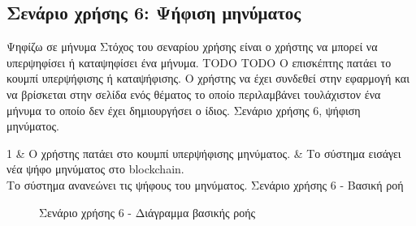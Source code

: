\subsection{Σενάριο χρήσης 6: Ψήφιση μηνύματος} \label{subsection:3-4-use-case-vote-post}

\useCaseTable
{Ψηφίζω σε μήνυμα}
{Στόχος του σεναρίου χρήσης είναι ο χρήστης να μπορεί να υπερψηφίσει ή καταψηφίσει ένα μήνυμα.}
{TODO}
{TODO}
{Ο επισκέπτης πατάει το κουμπί υπερψήφισης ή καταψήφισης.}
{Ο χρήστης να έχει συνδεθεί στην εφαρμογή και να βρίσκεται στην σελίδα ενός θέματος το οποίο περιλαμβάνει τουλάχιστον ένα μήνυμα το οποίο δεν έχει δημιουργήσει ο ίδιος.}
{Σενάριο χρήσης 6, ψήφιση μηνύματος.}
{\label{table:3-4-use-case-vote-post}}

\useCaseBaseFlowTable
{
    1 & Ο χρήστης πατάει στο κουμπί υπερψήφισης μηνύματος. & Το σύστημα εισάγει νέα ψήφο μηνύματος στο blockchain. \\ [0.5ex]
}
{Το σύστημα ανανεώνει τις ψήφους του μηνύματος.}
{Σενάριο χρήσης 6 - Βασική ροή}
{\label{table:3-4-use-case-vote-post-base-flow}}

\begin{figure}[H]
    \centering
    
    \caption{Σενάριο χρήσης 6 - Διάγραμμα βασικής ροής}
    \label{figure:3-4-use-case-vote-post-base-flow-sequence-diagram}
\end{figure}
